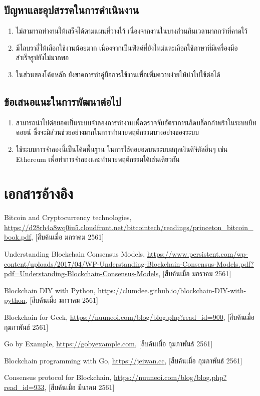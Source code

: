 \documentclass[letterpaper, 10pt, conference]{ieeeconf}
\begin{document}
\subsection{ปัญหาและอุปสรรคในการดำเนินงาน}
	\begin{enumerate}
		\item ไม่สามารถทำงานให้เสร็จได้ตามแผนที่วางไว้ เนื่องจากงานในบางส่วนกินเวลามากกว่าที่คาดไว้
		\item มีไลบราลี่ให้เลือกใช้งานน้อยมาก เนื่องจากเป็นฟิลด์ที่ยังใหม่และเลือกใช้ภาษาที่มีเครื่องมือสำเร็จรูปยังไม่มากพอ
		\item ในส่วนของโค้ดหลัก ยังขาดการทำคู่มือการใช้งานเพื่อเพิ่มความง่ายให้นำไปใช้ต่อได้
	\end{enumerate}

\subsection{ข้อเสนอแนะในการพัฒนาต่อไป}
	\begin{enumerate}
		\item สามารถนำไปต่อยอดเป็นระบบจำลองการทำงานเพื่อตรวจจับอัตราการเกิดบล็อกกำพร้าในระบบบิทคอยน์ ซึ่งจะมีส่วนช่วยอย่างมากในการทำนายพฤติกรรมบางอย่างของระบบ
		\item ใช้ระบบการจำลองนี้เป็นโค้ดพื้นฐาน ในการใช้ต่อยอดบนระบบสกุลเงินดิจิตัลอื่นๆ เช่น Ethereum เพื่อทำการจำลองและทำนายพฤติกรรมได้เช่นเดียวกัน
	\end{enumerate}

\section*{เอกสารอ้างอิง}
	\begin{enumerate}[ {[}1{]} ]
		\item Bitcoin and Cryptocurrency technologies, \url{https://d28rh4a8wq0iu5.cloudfront.net/bitcointech/readings/princeton_bitcoin_book.pdf}, 
		[สืบค้นเมื่อ มกราคม 2561]
		\item Understanding Blockchain Consensus Models, \url{https://www.persistent.com/wp-content/uploads/2017/04/WP-Understanding-Blockchain-Consensus-Models.pdf?pdf=Understanding-Blockchain-Consensus-Models},
		[สืบค้นเมื่อ มกราคม 2561]
		\item Blockchain DIY with Python, \url{https://clumdee.github.io/blockchain-DIY-with-python}, 
		[สืบค้นเมื่อ มกราคม 2561]
		\item Blockchain for Geek, \url{https://nuuneoi.com/blog/blog.php?read_id=900},
		[สืบค้นเมื่อ กุมภาพันธ์ 2561]
		\item Go by Example, \url{https://gobyexample.com}, 
		[สืบค้นเมื่อ กุมภาพันธ์ 2561]
		\item Blockchain programming with Go, \url{https://jeiwan.cc},
		[สืบค้นเมื่อ กุมภาพันธ์ 2561]
		\item Consensus protocol for Blockchain, \url{https://nuuneoi.com/blog/blog.php?read_id=933}, 
		[สืบค้นเมื่อ มีนาคม 2561]
	\end{enumerate}
\end{document}
